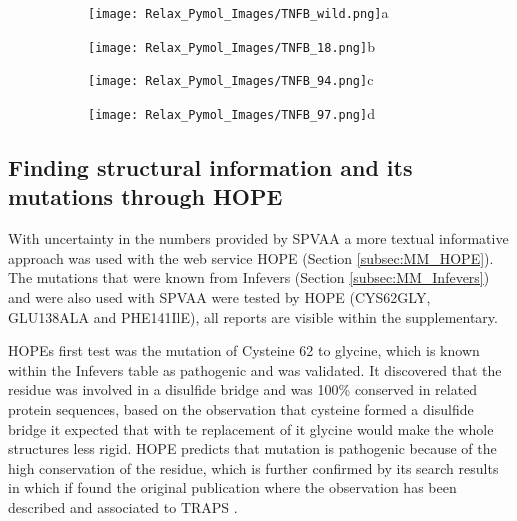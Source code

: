 		\begin{figure}[!ht]
		\centering
		\begin{subfigure}{0.45\textwidth}
			\texttt{[image: Relax\_Pymol\_Images/TNFB\_wild.png]}{a}
			\label{fig:RES_TNFB_wild}
		\end{subfigure}
		\begin{subfigure}{0.45\textwidth}
			\texttt{[image: Relax\_Pymol\_Images/TNFB\_18.png]}{b}
			\label{fig:RES_TNFB_18}
		\end{subfigure}
		\begin{subfigure}{0.45\textwidth}
			\texttt{[image: Relax\_Pymol\_Images/TNFB\_94.png]}{c}
			\label{fig:RES_TNFB_94}
		\end{subfigure}
		\begin{subfigure}{0.45\textwidth}
			\texttt{[image: Relax\_Pymol\_Images/TNFB\_97.png]}{d}
			\label{fig:RES_TNFB_97}
		\end{subfigure}
	\caption[TNF-$\beta$ relaxed and mutated models]{}
	\end{figure}
	
\newpage
	
\newpage	
\subsection{Finding structural information and its mutations through HOPE}
	With uncertainty in the numbers provided by SPVAA a more textual informative approach was used with the web service HOPE (Section \ref{subsec:MM_HOPE}). The mutations that were known from Infevers (Section \ref{subsec:MM_Infevers}) and were also used with SPVAA were tested by HOPE (CYS62GLY, GLU138ALA and PHE141IlE), all reports are visible within the supplementary.
	
	HOPEs first test was the mutation of Cysteine 62 to glycine, which is known within the Infevers table as pathogenic and was validated. It discovered that the residue was involved in a disulfide bridge and was 100\% conserved in related protein sequences, based on the observation that cysteine formed a disulfide bridge it expected that with te replacement of it glycine would make the whole structures less rigid. HOPE predicts that mutation is pathogenic because of the high conservation of the residue, which is further confirmed by its search results in which if found the original publication where the observation has been described and associated to TRAPS \cite{}.
	
